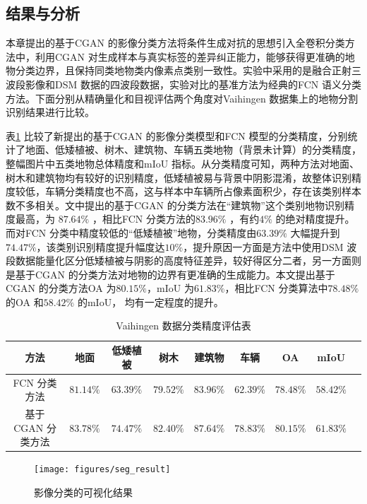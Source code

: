 \subsection{结果与分析}
\label{sec:third-3}

本章提出的基于CGAN 的影像分类方法将条件生成对抗的思想引入全卷积分类方法中，利用CGAN 对生成样本与真实标签的差异纠正能力，能够获得更准确的地物分类边界，且保持同类地物类内像素点类别一致性。实验中采用的是融合正射三波段影像和DSM 数据的四波段数据，实验对比的基准方法为经典的FCN 语义分类方法。下面分别从精确量化和目视评估两个角度对Vaihingen 数据集上的地物分割识别结果进行比较。

表\ref{tab:seg_refult} 比较了新提出的基于CGAN 的影像分类模型和FCN 模型的分类精度，分别统计了地面、低矮植被、树木、建筑物、车辆五类地物（背景未计算）的分类精度，整幅图片中五类地物总体精度和mIoU 指标。从分类精度可知，两种方法对地面、树木和建筑物均有较好的识别精度，低矮植被易与背景中阴影混淆，故整体识别精度较低，车辆分类精度也不高，这与样本中车辆所占像素面积少，存在该类别样本数不多相关。文中提出的基于CGAN 的分类方法在“建筑物”这个类别地物识别精度最高，为 $87.64\%$ ，相比FCN 分类方法的$83.96\%$ ，有约$4\%$ 的绝对精度提升。而对FCN 分类中精度较低的“低矮植被”地物，分类精度由$63.39\%$ 大幅提升到$74.47\%$，该类别识别精度提升幅度达$10\%$，提升原因一方面是方法中使用DSM 波段数据能量化区分低矮植被与阴影的高度特征差异，较好得区分二者，另一方面则是基于CGAN 的分类方法对地物的边界有更准确的生成能力。本文提出基于CGAN 的分类方法OA 为$80.15\%$，mIoU 为$61.83\%$，相比FCN 分类算法中$78.48\%$ 的OA 和$58.42\%$ 的mIoU， 均有一定程度的提升。

\begin{table}[htbp]
  \caption{Vaihingen 数据分类精度评估表}\label{tab:seg_refult}
  \centering
  \begin{tabular}{ccccccccc}
    \toprule
    方法              & 地面 & 低矮植被 & 树木 & 建筑物 & 车辆 & OA & mIoU \\
    \midrule
    FCN 分类方法      & $81.14\%$ & $63.39\%$ & $79.52\%$ & $83.96\%$ & $62.39\%$   & $78.48\%$ & $58.42\%$ \\
    基于CGAN 分类方法 & $83.78\%$ & $74.47\%$ & $82.40\%$ & $87.64\%$ & $78.83\%$ & $80.15\%$ & \textbf{$61.83\%$} \\
    \bottomrule
  \end{tabular}
\end{table}

\begin{figure}[htb]
  \centering
  \texttt{[image: figures/seg\_result]}
  \caption{影像分类的可视化结果}\label{fig:seg_result}
\end{figure}


